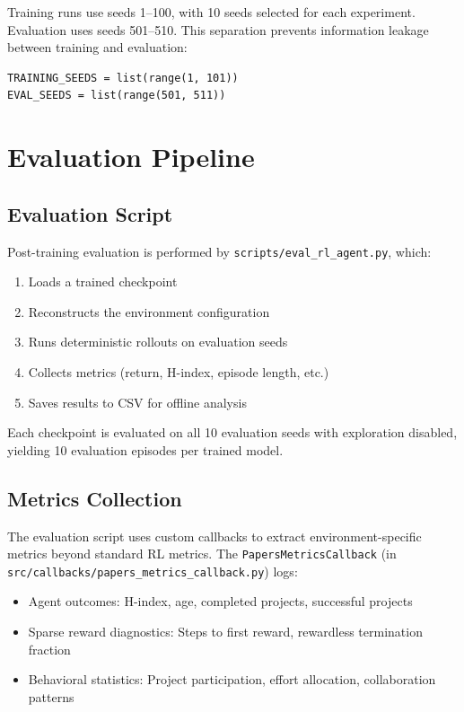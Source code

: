 \documentclass[english,bachelor]{hsluthesis}
\begin{document}
Training runs use seeds 1--100, with 10 seeds selected for each experiment. Evaluation uses seeds 501--510. This separation prevents information leakage between training and evaluation:

\begin{verbatim}
TRAINING_SEEDS = list(range(1, 101))
EVAL_SEEDS = list(range(501, 511))
\end{verbatim}

\section{Evaluation Pipeline}

\subsection{Evaluation Script}

Post-training evaluation is performed by \texttt{scripts/eval\_rl\_agent.py}, which:

\begin{enumerate}
    \item Loads a trained checkpoint
    \item Reconstructs the environment configuration
    \item Runs deterministic rollouts on evaluation seeds
    \item Collects metrics (return, H-index, episode length, etc.)
    \item Saves results to CSV for offline analysis
\end{enumerate}

Each checkpoint is evaluated on all 10 evaluation seeds with exploration disabled, yielding 10 evaluation episodes per trained model.

\subsection{Metrics Collection}

The evaluation script uses custom callbacks to extract environment-specific metrics beyond standard RL metrics. The \texttt{PapersMetricsCallback} (in \texttt{src/callbacks/papers\_metrics\_callback.py}) logs:

\begin{itemize}
    \item Agent outcomes: H-index, age, completed projects, successful projects
    \item Sparse reward diagnostics: Steps to first reward, rewardless termination fraction
    \item Behavioral statistics: Project participation, effort allocation, collaboration patterns
\end{itemize}
\end{document}

